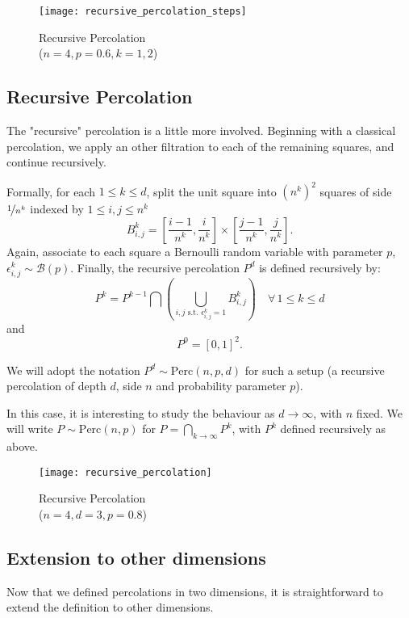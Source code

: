 \begin{wrapfigure}{r}{7.5cm}
	\vspace{-1.2cm}
	\centering
	\texttt{[image: recursive\_percolation\_steps]}
	\caption{Recursive Percolation\\($n=4, p=0.6, k=1,2$)}
	\label{fig:recursivePercolationSteps}
\end{wrapfigure}
\subsection{Recursive Percolation}
The "recursive" percolation is a little more involved.
Beginning with a classical percolation, we apply an other filtration to each of the remaining squares, and continue recursively.

Formally, for each $1 \leq k \leq d$, split the unit square into $\left( n^k \right)^2$ squares of side $\nicefrac{1}{n^k}$ indexed by $1 \leq i,j \leq n^k$
$$B_{i,j}^k = \left[ \frac{i-1}{n^k},\frac{i}{n^k} \right] \times \left[ \frac{j-1}{n^k},\frac{j}{n^k} \right].$$
Again, associate to each square a Bernoulli random variable with parameter $p$, $\epsilon_{i,j}^k \sim \mathcal{B}(p)$.
Finally, the recursive percolation $P^d$ is defined recursively by:
$$P^k = P^{k-1} \bigcap \left( \bigcup_{i,j \text{ s.t. } \epsilon_{i,j}^k = 1} B_{i,j}^k \right) \quad \forall \, 1 \leq k \leq d$$
and $$P^0 = \left[ 0,1 \right]^2.$$

We will adopt the notation $P^d \sim \text{Perc}(n,p,d)$ for such a setup (a recursive percolation of depth $d$, side $n$ and probability parameter $p$).

In this case, it is interesting to study the behaviour as $d \to \infty$, with $n$ fixed.
We will write $P \sim \text{Perc}(n,p)$ for $P = \bigcap_{k \to \infty} P^k$, with $P^k$ defined recursively as above.

\begin{figure}[!h]
	\centering
	\texttt{[image: recursive\_percolation]}
	\caption{Recursive Percolation\\($n=4, d=3, p=0.8$)}
	\label{fig:recursivePercolation}
\end{figure}

\subsection{Extension to other dimensions}
Now that we defined percolations in two dimensions, it is straightforward to extend the definition to other dimensions.

